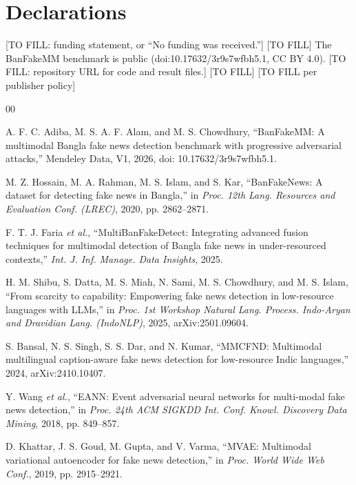 \documentclass[pdflatex,sn-mathphys-num]{sn-jnl}
\begin{document}
\section*{Declarations}
 [TO FILL: funding statement, or ``No funding was received.'']
 [TO FILL]
 The BanFakeMM benchmark is public (doi:10.17632/3r9s7wfbh5.1, CC BY 4.0). [TO FILL: repository URL for code and result files.]
 [TO FILL]
 [TO FILL per publisher policy]

\begin{thebibliography}{00}

 A. F. C. Adiba, M. S. A. F. Alam, and M. S. Chowdhury,
``BanFakeMM: A multimodal Bangla fake news detection benchmark with progressive
adversarial attacks,'' Mendeley Data, V1, 2026, doi: 10.17632/3r9s7wfbh5.1.

 M. Z. Hossain, M. A. Rahman, M. S. Islam, and S. Kar,
``BanFakeNews: A dataset for detecting fake news in Bangla,'' in
\emph{Proc. 12th Lang. Resources and Evaluation Conf. (LREC)}, 2020,
pp. 2862--2871.

 F. T. J. Faria \emph{et al.}, ``MultiBanFakeDetect:
Integrating advanced fusion techniques for multimodal detection of Bangla fake
news in under-resourced contexts,'' \emph{Int. J. Inf. Manage. Data Insights},
2025.

 H. M. Shibu, S. Datta, M. S. Miah, N. Sami,
M. S. Chowdhury, and M. S. Islam, ``From scarcity to capability: Empowering
fake news detection in low-resource languages with LLMs,'' in
\emph{Proc. 1st Workshop Natural Lang. Process. Indo-Aryan and Dravidian Lang.
(IndoNLP)}, 2025, arXiv:2501.09604.

 S. Bansal, N. S. Singh, S. S. Dar, and N. Kumar, ``MMCFND:
Multimodal multilingual caption-aware fake news detection for low-resource
Indic languages,'' 2024, arXiv:2410.10407.

 Y. Wang \emph{et al.}, ``EANN: Event adversarial neural
networks for multi-modal fake news detection,'' in \emph{Proc. 24th ACM SIGKDD
Int. Conf. Knowl. Discovery Data Mining}, 2018, pp. 849--857.

 D. Khattar, J. S. Goud, M. Gupta, and V. Varma, ``MVAE:
Multimodal variational autoencoder for fake news detection,'' in \emph{Proc.
World Wide Web Conf.}, 2019, pp. 2915--2921.


\end{thebibliography}
\end{document}
